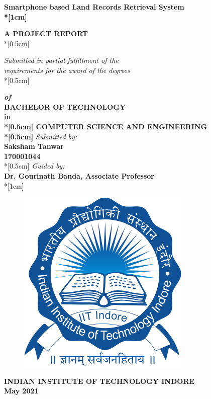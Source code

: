 \documentclass[12pt]{article}
\newcommand{\mainauth}{Saksham Tanwar}
\newcommand{\roll}{170001044}
\begin{document}

\begin{center}
    \textbf{\Huge{Smartphone based Land Records Retrieval System}\\*[1cm]}

    \textbf{A PROJECT REPORT}\\*[0.5cm]

    \textit{Submitted in partial fulfillment of the\\ requirements for the award of the degrees}\\*[0.5cm]

    {
        \bfseries
        \textit{of}\\
        BACHELOR OF TECHNOLOGY\\
        in\\*[0.5cm]
        COMPUTER SCIENCE AND ENGINEERING\\*[0.5cm]
    }
    \textit{Submitted by:}\\
    \textbf{\mainauth}\\
    \textbf{\roll}\\*[0.5cm]
    \textit{Guided by:}\\
    \textbf{Dr. Gourinath Banda, Associate Professor}\\*[1cm]
    \begin{figure}[H]
        \includegraphics[scale=0.5]{iiti_logo}
        \centering
    \end{figure}
    \textbf{INDIAN INSTITUTE OF TECHNOLOGY INDORE}\\
    \textbf{May 2021}
    \thispagestyle{empty}
\end{center}
\clearpage

\end{document}
